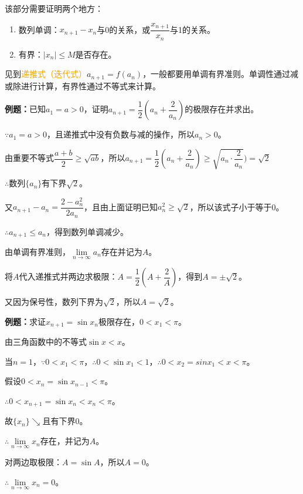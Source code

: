 \documentclass[UTF8, 12pt]{ctexart}
\begin{document}
    该部分需要证明两个地方：

    \begin{enumerate}
        \item 数列单调：$x_{n+1}-x_n$与0的关系，或$\dfrac{x_{n+1}}{x_n}$与1的关系。
        \item 有界：$\vert x_n\vert\leqslant M$是否存在。
    \end{enumerate}

    见到\textcolor{orange}{递推式（迭代式）}$a_{n+1}=f(a_n)$，一般都要用单调有界准则。单调性通过减或除进行计算，有界性通过不等式来计算。

    \textbf{例题：}已知$a_1=a>0$，证明$a_{n+1}=\dfrac{1}{2}\left(a_n+\dfrac{2}{a_n}\right)$的极限存在并求出。

    $\because a_1=a>0$，且递推式中没有负数与减的操作，所以$a_n>0$。

    由重要不等式$\dfrac{a+b}{2}\geqslant\sqrt{ab}$，所以$a_{n+1}=\dfrac{1}{2}\left(a_n+\dfrac{2}{a_n}\right)\geqslant\sqrt{a_n\cdot\dfrac{2}{a_n}})=\sqrt{2}$

    $\therefore$数列$\{a_n\}$有下界$\sqrt{2}$。

    又$a_{n+1}-a_n=\dfrac{2-a_n^2}{2a_n}$，且由上面证明已知$a_n^2\geqslant\sqrt{2}$，所以该式子小于等于0。

    $\therefore a_{n+1}\leqslant a_n$，得到数列单调减少。

    由单调有界准则，$\lim\limits_{n\to\infty}a_n$存在并记为$A$。

    将$A$代入递推式并两边求极限：$A=\dfrac{1}{2}(A+\dfrac{2}{A})$，得到$A=\pm\sqrt{2}$。

    又因为保号性，数列下界为$\sqrt{2}$，所以$A=\sqrt{2}$。

    \textbf{例题：}求证$x_{n+1}=\sin x_n$极限存在，$0<x_1<\pi$。

    由三角函数中的不等式$\sin x<x$。

    当$n=1$，$\because 0<x_1<\pi$，$\therefore 0<\sin x_1<1$，$\therefore 0<x_2=sin x_1<x<\pi$。

    假设$0<x_n=\sin x_{n-1}<\pi$。

    $\therefore 0<x_{n+1}=\sin x_n<x_n<\pi$。

    故$\{x_n\}\searrow$且有下界0。

    $\therefore\lim\limits_{n\to\infty}x_n$存在，并记为$A$。

    对两边取极限：$A=\sin A$，所以$A=0$。

    $\therefore\lim\limits_{n\to\infty}x_n=0$。
\end{document}

